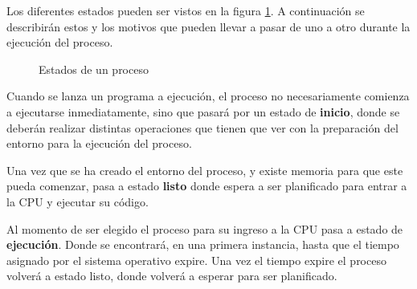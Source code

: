 Los diferentes estados pueden ser vistos en la figura
\ref{fig:procesos_estados}. A continuación se describirán estos y los motivos
que pueden llevar a pasar de uno a otro durante la ejecución del proceso.

\begin{figure}[htbp]
	\centering
	\caption{Estados de un proceso}
	\label{fig:procesos_estados}
\end{figure}

Cuando se lanza un programa a ejecución, el proceso no necesariamente comienza a
ejecutarse inmediatamente, sino que pasará por un estado de \textbf{inicio},
donde se deberán realizar distintas operaciones que tienen que ver con la
preparación del entorno para la ejecución del proceso.

Una vez que se ha creado el entorno del proceso, y existe memoria para que este
pueda comenzar, pasa a estado \textbf{listo} donde espera a ser planificado para
entrar a la CPU y ejecutar su código.

Al momento de ser elegido el proceso para su ingreso a la CPU pasa a estado de
\textbf{ejecución}. Donde se encontrará, en una primera instancia, hasta que el
tiempo asignado por el sistema operativo expire. Una vez el tiempo expire el
proceso volverá a estado listo, donde volverá a esperar para ser planificado.

